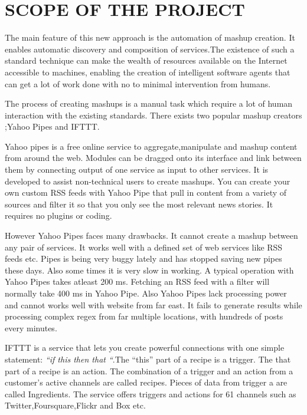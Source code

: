 
\chapter{SCOPE OF THE PROJECT}
\begin{spacing}{1.5}

The main feature of this new approach is the automation of mashup creation. It enables automatic  discovery and composition of services.The existence of such a standard technique can make the wealth of resources available on the Internet accessible to machines, enabling the creation of intelligent software agents that can get a lot of work done with no to minimal intervention from humans.

The process of creating mashups is a manual task  which require a lot of human interaction with the existing standards. There exists  two popular mashup creators ;Yahoo Pipes\cite{pip} and IFTTT\cite{ift}.

Yahoo pipes is a free online service to aggregate,manipulate and mashup content from around the web. Modules can be dragged onto its interface and link between them by connecting output of one service as input to other services. It is developed to assist non-technical users to create mashups. You can create your own custom RSS feeds  with Yahoo Pipe that pull in content from a variety of sources and filter it so that you only see the most relevant news stories. It requires no plugins or coding.

However Yahoo Pipes faces many drawbacks. It cannot create a mashup between any pair  of services. It works well with a defined set of web services like RSS feeds etc. Pipes is being very buggy lately and has stopped saving new pipes these days. Also  some times it is very slow in working. A typical operation with Yahoo Pipes takes atleast 200 ms. Fetching an RSS feed with a filter will normally take 400 ms in Yahoo Pipe. Also Yahoo Pipes lack processing power and cannot works well with website from far east. It fails to generate results while processing complex regex from far multiple locations, with hundreds of posts every minutes.

IFTTT is a service that lets you create powerful connections with one simple statement: {\it “if this then that “}.The “this” part of a recipe is a trigger. The that part of a recipe is an action. The combination of a trigger and an action from a customer's active channels are called recipes. Pieces of data from trigger a are called Ingredients. The service offers triggers and actions for 61 channels such as Twitter,Foursquare,Flickr and Box etc.


\end{spacing}
